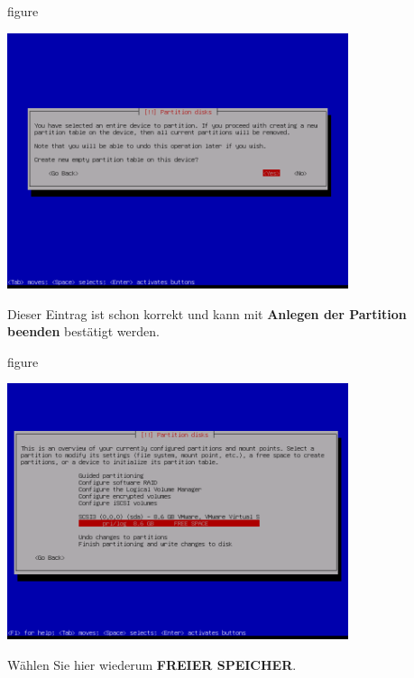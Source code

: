 \begin{nofloat}{figure}
\begin{center}
\includegraphics[width=0.75\textwidth]{screenshots/13_ubuntu_install.png}
\end{center}
\end{nofloat}

\pagebreak
Dieser Eintrag ist schon korrekt und kann mit \textbf{Anlegen der Partition beenden} bestätigt werden.

\begin{nofloat}{figure}
\begin{center}
\includegraphics[width=0.75\textwidth]{screenshots/14_ubuntu_install.png}
\end{center}
\end{nofloat}

Wählen Sie hier wiederum \textbf{FREIER SPEICHER}.

